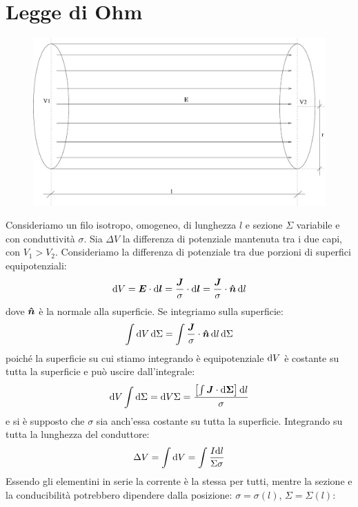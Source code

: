 \section{Legge di Ohm}
\begin{figure}[htbp]
 \centering
 \includegraphics[scale=0.4]{immagini/fisica2/ohm1}
\end{figure}
Consideriamo un filo isotropo, omogeneo, di lunghezza $l$ e sezione $\Sigma$ variabile e con conduttività $\sigma$. Sia $\Delta V$ la differenza di potenziale mantenuta tra i due capi, con $V_1>V_2$. Consideriamo la differenza di potenziale tra due porzioni di superfici equipotenziali:
\begin{equation}
 \mathrm{d} V = \boldsymbol{E}\cdot\mathrm{d} \boldsymbol{l} = \frac{\boldsymbol{J}}{\sigma}\cdot\mathrm{d}\boldsymbol{l}=\frac{\boldsymbol{J}}{\sigma}\cdot\boldsymbol{\hat {n}}\,\mathrm{d} l
\end{equation}
dove $\boldsymbol{\hat {n}}$ è la normale alla superficie. Se integriamo sulla superficie:
\begin{equation}
 \int\mathrm{d} V\,\mathrm{d}\Sigma=\int\frac{\boldsymbol{J}}{\sigma}\cdot\boldsymbol{\hat {n}}\,\mathrm{d} l\,\mathrm{d}\Sigma
\end{equation}
poiché la superficie su cui stiamo integrando è equipotenziale $\mathrm{d} V$ è costante su tutta la superficie e può uscire dall'integrale:
\begin{equation}
 \mathrm{d} V\int\mathrm{d}\Sigma = \mathrm{d} V\Sigma=\frac{\left[\int\boldsymbol{J}\cdot\mathrm{d}\boldsymbol{\Sigma}\right]\mathrm{d} l}{\sigma}
\end{equation}
e si è supposto che $\sigma$ sia anch'essa costante su tutta la superficie. Integrando su tutta la lunghezza del conduttore:
\begin{equation}
 \Delta V = \int\mathrm{d} V=\int\frac{I\mathrm{d} l}{\Sigma\sigma}
\end{equation}
Essendo gli elementini in serie la corrente è la stessa per tutti, mentre la sezione e la conducibilità potrebbero dipendere dalla posizione: $\sigma=\sigma(l)$, $\Sigma=\Sigma(l)$:
